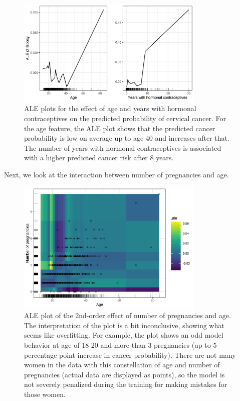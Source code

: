\documentclass[
  10pt,
]{scrbook}
\begin{document}
\begin{figure}

{\centering \includegraphics[width=0.8\textwidth]{images/ale-cervical-1D-1} 

}

\caption{ALE plots for the effect of age and years with hormonal contraceptives on the predicted probability of cervical cancer. For the age feature, the ALE plot shows that the predicted cancer probability is low on average up to age 40 and increases after that. The number of years with hormonal contraceptives is associated with a higher predicted cancer risk after 8 years.}\label{fig:ale-cervical-1D}
\end{figure}

Next, we look at the interaction between number of pregnancies and age.

\begin{figure}

{\centering \includegraphics[width=0.8\textwidth]{images/ale-cervical-2d-1} 

}

\caption{ALE plot of the 2nd-order effect of number of pregnancies and age. The interpretation of the plot is a bit inconclusive, showing what seems like overfitting. For example, the plot shows an odd model behavior at age of 18-20 and more than 3 pregnancies (up to 5 percentage point increase in cancer probability). There are not many women in the data with this constellation of age and number of pregnancies (actual data are displayed as points), so the model is not severely penalized during the training for making mistakes for those women.}\label{fig:ale-cervical-2d}
\end{figure}
\end{document}
